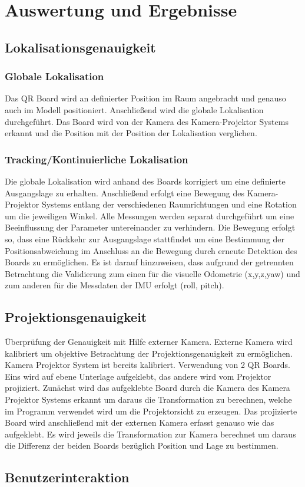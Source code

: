\chapter{Auswertung und Ergebnisse}

\section{Lokalisationsgenauigkeit}


\subsection{Globale Lokalisation}
Das QR Board wird an definierter Position im Raum angebracht und genauso auch im Modell positioniert. Anschließend wird die globale Lokalisation durchgeführt. Das Board wird von der Kamera des Kamera-Projektor Systems erkannt und die Position mit der Position der Lokalisation verglichen.


\subsection{Tracking/Kontinuierliche Lokalisation}
Die globale Lokalisation wird anhand des Boards korrigiert um eine definierte Ausgangslage zu erhalten. Anschließend erfolgt eine Bewegung des Kamera-Projektor Systems entlang der verschiedenen Raumrichtungen und eine Rotation um die jeweiligen Winkel. Alle Messungen werden separat durchgeführt um eine Beeinflussung der Parameter untereinander zu verhindern. Die Bewegung erfolgt so, dass eine Rückkehr zur Ausgangslage stattfindet um eine Bestimmung der Positionsabweichung im Anschluss an die Bewegung durch erneute Detektion des Boards zu ermöglichen. Es ist darauf hinzuweisen, dass aufgrund der getrennten Betrachtung die Validierung zum einen für die visuelle Odometrie (x,y,z,yaw) und zum anderen für die Messdaten der IMU erfolgt (roll, pitch).

\section{Projektionsgenauigkeit}
Überprüfung der Genauigkeit mit Hilfe externer Kamera. Externe Kamera wird kalibriert um objektive Betrachtung der Projektionsgenauigkeit zu ermöglichen. Kamera Projektor System ist bereits kalibriert. Verwendung von 2 QR Boards. Eins wird auf ebene Unterlage aufgeklebt, das andere wird vom Projektor projiziert. Zunächst wird das aufgeklebte Board durch die Kamera des Kamera Projektor Systems erkannt um daraus die Transformation zu berechnen, welche im Programm verwendet wird um die Projektorsicht zu erzeugen. Das projizierte Board wird anschließend mit der externen Kamera erfasst genauso wie das aufgeklebt. Es wird jeweils die Transformation zur Kamera berechnet um daraus die Differenz der beiden Boards bezüglich Position und Lage zu bestimmen.

\section{Benutzerinteraktion}